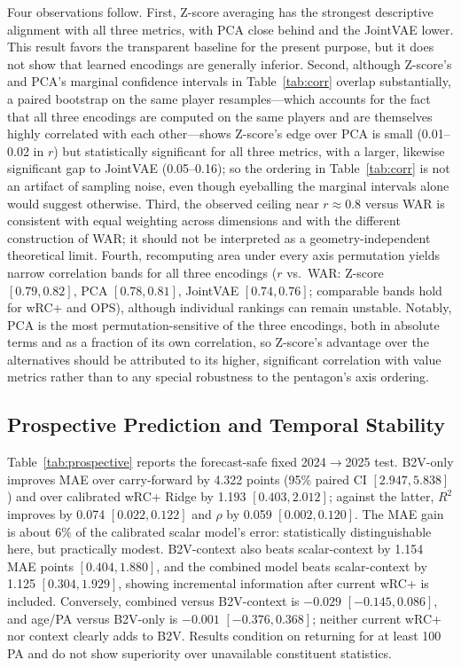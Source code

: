 \documentclass[10pt,twocolumn,letterpaper]{article}
\begin{document}
Four observations follow. First, Z-score averaging has the strongest descriptive alignment with all three metrics, with PCA close behind and the JointVAE lower. This result favors the transparent baseline for the present purpose, but it does not show that learned encodings are generally inferior. Second, although Z-score's and PCA's marginal confidence intervals in Table~\ref{tab:corr} overlap substantially, a paired bootstrap on the same player resamples---which accounts for the fact that all three encodings are computed on the same players and are themselves highly correlated with each other---shows Z-score's edge over PCA is small (0.01--0.02 in $r$) but statistically significant for all three metrics, with a larger, likewise significant gap to JointVAE (0.05--0.16); so the ordering in Table~\ref{tab:corr} is not an artifact of sampling noise, even though eyeballing the marginal intervals alone would suggest otherwise. Third, the observed ceiling near $r \approx 0.8$ versus WAR is consistent with equal weighting across dimensions and with the different construction of WAR; it should not be interpreted as a geometry-independent theoretical limit. Fourth, recomputing area under every axis permutation yields narrow correlation bands for all three encodings ($r$ vs.\ WAR: Z-score $[0.79, 0.82]$, PCA $[0.78, 0.81]$, JointVAE $[0.74, 0.76]$; comparable bands hold for wRC+ and OPS), although individual rankings can remain unstable. Notably, PCA is the most permutation-sensitive of the three encodings, both in absolute terms and as a fraction of its own correlation, so Z-score's advantage over the alternatives should be attributed to its higher, significant correlation with value metrics rather than to any special robustness to the pentagon's axis ordering.

\subsection{Prospective Prediction and Temporal Stability}
\label{sec:prospective-results}
Table~\ref{tab:prospective} reports the forecast-safe fixed 2024$\to$2025 test. B2V-only improves MAE over carry-forward by 4.322 points (95\% paired CI $[2.947,5.838]$) and over calibrated wRC+ Ridge by 1.193 $[0.403,2.012]$; against the latter, $R^2$ improves by 0.074 $[0.022,0.122]$ and $\rho$ by 0.059 $[0.002,0.120]$. The MAE gain is about 6\% of the calibrated scalar model's error: statistically distinguishable here, but practically modest. B2V-context also beats scalar-context by 1.154 MAE points $[0.404,1.880]$, and the combined model beats scalar-context by 1.125 $[0.304,1.929]$, showing incremental information after current wRC+ is included. Conversely, combined versus B2V-context is $-0.029$ $[-0.145,0.086]$, and age/PA versus B2V-only is $-0.001$ $[-0.376,0.368]$; neither current wRC+ nor context clearly adds to B2V. Results condition on returning for at least 100 PA and do not show superiority over unavailable constituent statistics.
\end{document}
